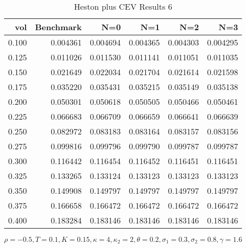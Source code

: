 \begin{table}[ht]
  \centering
  \caption{Heston plus CEV Results 6}
  \begin{tabular}{rrrrrr}
  \toprule
    vol &       Benchmark &       N=0 &       N=1 &       N=2 &       N=3 \\
  \midrule
  0.100 & 0.004361 & 0.004694 & 0.004365 & 0.004303 & 0.004295 \\
  0.125 & 0.011026 & 0.011530 & 0.011141 & 0.011051 & 0.011035 \\
  0.150 & 0.021649 & 0.022034 & 0.021704 & 0.021614 & 0.021598 \\
  0.175 & 0.035220 & 0.035431 & 0.035215 & 0.035149 & 0.035138 \\
  0.200 & 0.050301 & 0.050618 & 0.050505 & 0.050466 & 0.050461 \\
  0.225 & 0.066683 & 0.066709 & 0.066659 & 0.066641 & 0.066639 \\
  0.250 & 0.082972 & 0.083183 & 0.083164 & 0.083157 & 0.083156 \\
  0.275 & 0.099816 & 0.099796 & 0.099790 & 0.099787 & 0.099787 \\
  0.300 & 0.116442 & 0.116454 & 0.116452 & 0.116451 & 0.116451 \\
  0.325 & 0.133265 & 0.133124 & 0.133123 & 0.133123 & 0.133123 \\
  0.350 & 0.149908 & 0.149797 & 0.149797 & 0.149797 & 0.149797 \\
  0.375 & 0.166658 & 0.166472 & 0.166472 & 0.166472 & 0.166472 \\
  0.400 & 0.183284 & 0.183146 & 0.183146 & 0.183146 & 0.183146 \\
  \bottomrule
  \end{tabular}
  \small{$\rho = -0.5,T=0.1,K=0.15, \kappa = 4, \kappa_2 =2, \theta =0.2, \sigma_1 =0.3, \sigma_2 = 0.8, \gamma = 1.6$}
  \end{table}        